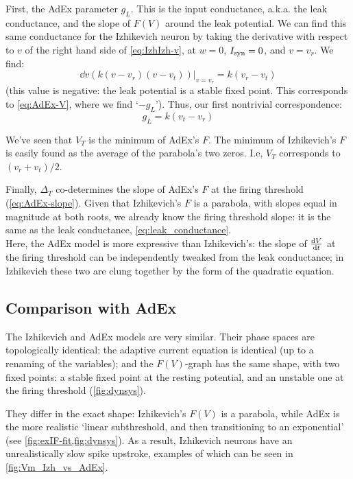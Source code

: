 First, the AdEx parameter $g_L$. This is the input conductance, a.k.a. the leak conductance, and the slope of $F(V)$ around the leak potential. We can find this same conductance for the Izhikevich neuron by taking the derivative with respect to $v$ of the right hand side of \cref{eq:IzhIzh-v}, at $w = 0$, $I_{\text{syn}} = 0$, and $v = v_r$. We find:
\begin{equation}
    \dd{v}(k(v-v_r)(v-v_t)) \Big|_{v=v_r} = k(v_r - v_t)
\end{equation}
(this value is negative: the leak potential is a stable fixed point. This corresponds to \cref{eq:AdEx-V}, where we find `$-g_L$').
Thus, our first nontrivial correspondence:
\begin{equation}
    g_L = k (v_t - v_r)  \label{eq:leak_conductance}
\end{equation}

We've seen that $V_T$ is the minimum of AdEx's $F$.
The minimum of Izhikevich's $F$ is easily found as the average of the parabola's two zeros. I.e, $V_T$ corresponds to $(v_r + v_t) / 2$.

Finally, $Δ_T$ co-determines the slope of AdEx's $F$ at the firing threshold (\cref{eq:AdEx-slope}). Given that Izhikevich's $F$ is a parabola, with slopes equal in magnitude at both roots, we already know the firing threshold slope: it is the same as the leak conductance, \cref{eq:leak_conductance}.\\
Here, the AdEx model is more expressive than Izhikevich's: the slope of $\frac{\mathrm{d}V}{\mathrm{d}t}$ at the firing threshold can be independently tweaked from the leak conductance; in Izhikevich these two are clung together by the form of the quadratic equation.

\FloatBarrier
\subsection{Comparison with AdEx}

The Izhikevich and AdEx models are very similar. Their phase spaces are topologically identical:
the adaptive current equation is identical (up to a renaming of the variables); and the $F(V)$-graph has the same shape, with two fixed points: a stable fixed point at the resting potential, and an unstable one at the firing threshold (\cref{fig:dynsys}).

They differ in the exact shape: Izhikevich's $F(V)$ is a parabola, while AdEx is the more realistic `linear subthreshold, and then transitioning to an exponential' (see \cref{fig:exIF-fit,fig:dynsys}).
As a result, Izhikevich neurons have an unrealistically slow spike upstroke, examples of which can be seen in \cref{fig:Vm_Izh_vs_AdEx}.

